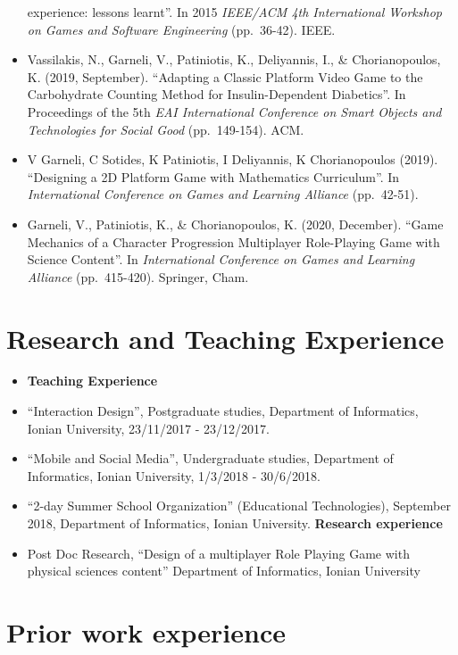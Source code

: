 \documentclass[%
    11pt,
  oneside
  ]{memoir}
\let\oldsection\section
\renewcommand{\section}[1]{%
  \oldsection{#1}
  \leavevmode
  \par
  \vspace{\dimexpr-\baselineskip-\parskip}
}
\begin{document}
\begin{itemize}
  experience: lessons learnt''. In 2015 \emph{IEEE/ACM 4th International
  Workshop on Games and Software Engineering} (pp.~36-42). IEEE.
\item
  Vassilakis, N., Garneli, V., Patiniotis, K., Deliyannis, I., \&
  Chorianopoulos, K. (2019, September). ``Adapting a Classic Platform
  Video Game to the Carbohydrate Counting Method for Insulin-Dependent
  Diabetics''. In Proceedings of the 5th \emph{EAI International
  Conference on Smart Objects and Technologies for Social Good}
  (pp.~149-154). ACM.
\item
  V Garneli, C Sotides, K Patiniotis, I Deliyannis, K Chorianopoulos
  (2019). ``Designing a 2D Platform Game with Mathematics Curriculum''.
  In \emph{International Conference on Games and Learning Alliance}
  (pp.~42-51).
\item
  Garneli, V., Patiniotis, K., \& Chorianopoulos, K. (2020, December).
  ``Game Mechanics of a Character Progression Multiplayer Role-Playing
  Game with Science Content''. In \emph{International Conference on
  Games and Learning Alliance} (pp.~415-420). Springer, Cham.
\end{itemize}

\hypertarget{research-and-teaching-experience}{%
\section{Research and Teaching
Experience}\label{research-and-teaching-experience}}

\begin{itemize}
\tightlist
\item
  \textbf{Teaching Experience}
\item
  ``Interaction Design'', Postgraduate studies, Department of
  Informatics, Ionian University, 23/11/2017 - 23/12/2017.
\item
  ``Mobile and Social Media'', Undergraduate studies, Department of
  Informatics, Ionian University, 1/3/2018 - 30/6/2018.
\item
  ``2-day Summer School Organization'' (Educational Technologies),
  September 2018, Department of Informatics, Ionian University.
  \textbf{Research experience}
\item
  Post Doc Research, ``Design of a multiplayer Role Playing Game with
  physical sciences content'' Department of Informatics, Ionian
  University
\end{itemize}

\hypertarget{prior-work-experience}{%
\section{Prior work experience}\label{prior-work-experience}}
\end{document}
